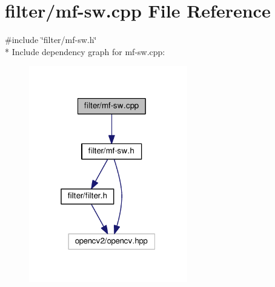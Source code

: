 \hypertarget{mf-sw_8cpp}{}\section{filter/mf-\/sw.cpp File Reference}
\label{mf-sw_8cpp}
{\ttfamily \#include \char`\"{}filter/mf-\/sw.\+h\char`\"{}}\\*
Include dependency graph for mf-\/sw.cpp\+:
\nopagebreak
\begin{figure}[H]
\begin{center}
\leavevmode
\includegraphics[width=196pt]{mf-sw_8cpp__incl}
\end{center}
\end{figure}
